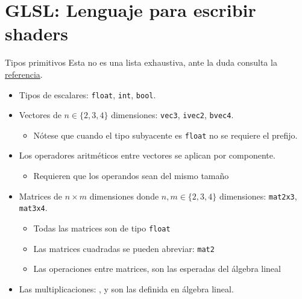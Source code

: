 \section{GLSL: Lenguaje para escribir shaders}

\begin{frame}[fragile]{Tipos primitivos}
Esta \alert{no es} una lista exhaustiva, ante la duda consulta la \href{https://www.khronos.org/opengl/wiki/Data_Type_(GLSL)}{referencia}.
\begin{itemize}
    \item Tipos de escalares: \texttt{float}, \texttt{int}, \texttt{bool}.
    \item Vectores de $n \in \{2, 3, 4\}$ dimensiones: \texttt{vec3}, \texttt{ivec2}, \texttt{bvec4}.
    \begin{itemize}
        \item Nótese que cuando el tipo subyacente es \texttt{float} no se requiere el prefijo.
    \end{itemize}
    \item Los operadores aritméticos entre vectores se aplican por componente.
    \begin{itemize}
        \item Requieren que los operandos sean del mismo tamaño
    \end{itemize}
    \item Matrices de $n\times m$ dimensiones donde $n, m \in \{2, 3, 4\}$ dimensiones: \texttt{mat2x3}, \texttt{mat3x4}.
    \begin{itemize}
        \item Todas las matrices son de tipo \texttt{float}
        \item Las matrices cuadradas se pueden abreviar: \texttt{mat2}
        \item Las operaciones entre matrices, son las esperadas del álgebra lineal
    \end{itemize}
    \item Las multiplicaciones: ,  y   son las definida en álgebra lineal.
\end{itemize}

\end{frame}

